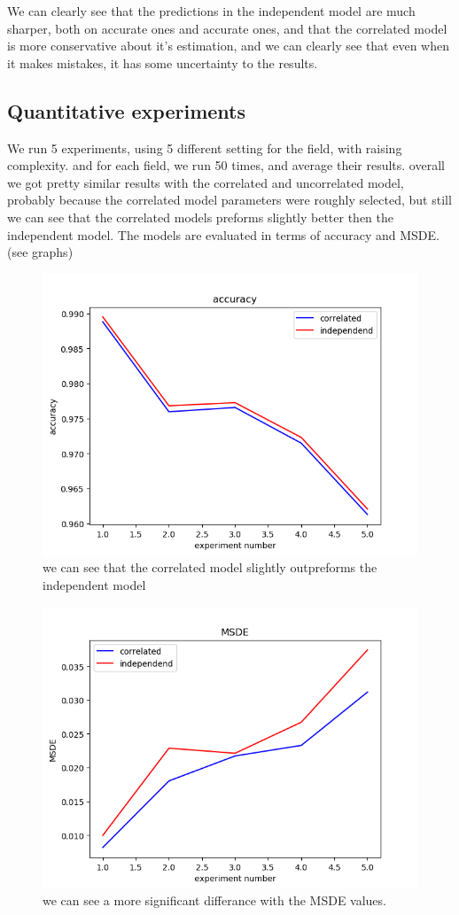 \documentclass{article}
\begin{document}
	We can clearly see that the predictions in the independent model are much sharper, both on accurate ones and accurate ones, and that the correlated model is more conservative about it's estimation, and we can clearly see that even when it makes mistakes, it has some uncertainty to the results. 
	
	
	\subsection{Quantitative experiments}
	We run 5 experiments, using 5 different setting for the field, with raising complexity.  and for each field, we run 50 times, and average their results.
	overall we got pretty similar results with the correlated and uncorrelated model, probably because the correlated model parameters were roughly selected, but still we can see that the correlated models preforms slightly better then the independent model. The models are evaluated in terms of accuracy and MSDE.(see graphs)
	
	\begin{figure}
		\centering
		\includegraphics[width=0.7\linewidth, height=0.3\textheight]{../figures/accuracy_results}
		\caption[Accuracy results]{we can see that the correlated model slightly outpreforms the independent model}
		\label{fig:accuracyresults}
	\end{figure}
	\begin{figure}[h]
		\centering
		\includegraphics[width=0.7\linewidth, height=0.3\textheight]{../figures/MSDE_results}
		\caption[MSDE results]{we can see a more significant differance with the MSDE values.}
		\label{fig:msderesults}
	\end{figure}
	
\end{document}
